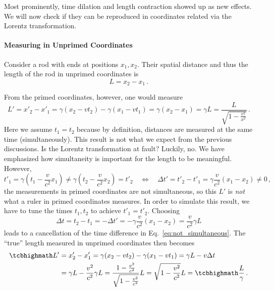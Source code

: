 \documentclass[../relativity_main.tex]{subfiles}
\begin{document}
Most prominently, time dilation and length contraction showed up as new effects. We will now check if they can be reproduced in coordinates related via the Lorentz transformation.



			\paragraph{Measuring in Unprimed Coordinates}
Consider a rod with ends at positions $x_1, x_2$. Their spatial distance and thus the length of the rod in unprimed coordinates is
\begin{equation*}
	L = x_2 - x_1 \, .
\end{equation*}

From the primed coordinates, however, one would measure
\begin{equation}\label{eq:length_contraction_not_correct}
	L' = x'_2 - x'_1 = \gamma (x_2 - v t_2) - \gamma (x_1 - v t_1) = \gamma (x_2 - x_1) = \gamma L = \frac{L}{\sqrt{1 - \frac{v^2}{x^2}}} \, .
\end{equation}
Here we assume $t_1 = t_2$ because by definition, distances are measured at the same time (simultaneously). This result is not what we expect from the previous discussions. Is the Lorentz transformation at fault? Luckily, no. We have emphasized how simultaneity is important for the length to be meaningful. However,
\begin{equation}\label{eq:not_simultaneous}
	t'_1 = \gamma (t_1 - \frac{v}{c^2} x_1) \neq \gamma (t_2 - \frac{v}{c^2} x_2) = t'_2
	\quad \Leftrightarrow \quad
	\Delta t' = t'_2 - t'_1 = \gamma \frac{v}{c^2} (x_1 - x_2) \neq 0
	\, ,
\end{equation}
the measurements in primed coordinates are not simultaneous, so this $L'$ is \emph{not} what a ruler in primed coordinates measures. In order to simulate this result, we have to tune the times $t_1, t_2$ to achieve $t'_1 = t'_2$. Choosing
\begin{equation}
	\Delta t = t_2 - t_1 = - \Delta t' = - \gamma \frac{v}{c^2} (x_1 - x_2) = \frac{v}{c^2} \gamma L
\end{equation}
leads to a cancellation of the time difference in Eq.~\eqref{eq:not_simultaneous}. The \enquote{true} length measured in unprimed coordinates then becomes
\begin{equation}\label{eq:length_contraction_correct}
	\begin{split}
	\eqbox{L'} &= x'_2 - x'_1 = \gamma (x_2 - v t_2) - \gamma (x_1 - v t_1) = \gamma L - v \Delta t
	\\
	&= \gamma L - \frac{v^2}{c^2} \gamma L = \frac{1 - \frac{v^2}{c^2}}{\sqrt{1 - \frac{v^2}{c^2}}} L = \sqrt{1 - \frac{v^2}{c^2}} L = \eqbox{\frac{L}{\gamma}} \, .
	\end{split}
\end{equation}
\end{document}
